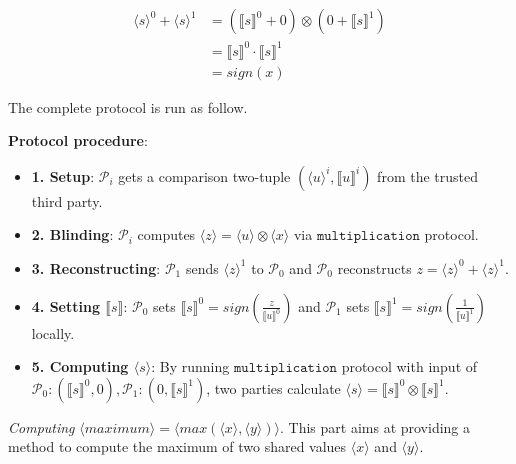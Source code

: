 \documentclass[letterpaper]{article} %
\begin{document}
    \begin{align*}
        \langle s\rangle^{0} +\langle s\rangle^{1}&=(\llbracket s \rrbracket ^{0}+0)\otimes (0+\llbracket s \rrbracket ^{1})\\
        &=\llbracket s \rrbracket ^{0}\cdot \llbracket s \rrbracket ^{1}\\
        &=sign(x)
    \end{align*}

    

    
       The complete protocol is run as follow. 
    
       \textbf{Protocol procedure}:
       \begin{itemize}
           \item \textbf{1. Setup}: $\mathcal{P}_{i}$ gets a comparison two-tuple $(\langle u\rangle ^{i},\llbracket u \rrbracket ^{i})$ from the trusted third party.
           
           \item \textbf{2. Blinding}: 
           $\mathcal{P}_{i}$ computes $\langle z\rangle = \langle u\rangle \otimes \langle x\rangle $ via $\mathtt{multiplication}$ protocol.


           \item \textbf{3. Reconstructing}:
           $\mathcal{P}_{1}$ sends $\langle z\rangle ^{1}$ to $\mathcal{P}_{0}$ and 
           $\mathcal{P}_{0}$ reconstructs
           $z = \langle z\rangle ^{0}+\langle z\rangle ^{1}$.


        
           \item \textbf{4. Setting $\llbracket s \rrbracket$}: 
           $\mathcal{P}_{0}$ sets $\llbracket s \rrbracket^{0}
           =sign(\frac{z}{\llbracket u \rrbracket^{0}})$
           and $\mathcal{P}_{1}$ sets $\llbracket s \rrbracket^{1}
           =sign(\frac{1}{\llbracket u \rrbracket^{1}})$ locally.
       
           \item \textbf{5. Computing $\langle s\rangle$}: 
           By running $\mathtt{multiplication}$ protocol with input of 
           $\mathcal{P}_{0}:(\llbracket s \rrbracket ^{0},0),\mathcal{P}_{1}:(0,\llbracket s \rrbracket ^{1})$, 
           two parties calculate  $\langle s\rangle = \llbracket s \rrbracket ^{0}\otimes \llbracket s \rrbracket ^{1}$.

       \end{itemize}
    

    
       \emph{Computing} $ \langle maximum\rangle  = \langle max(\langle x\rangle,\langle y\rangle)\rangle $.
       This part aims at providing a method to compute the maximum of two shared values $\langle x \rangle$ and $\langle y \rangle$.
       
\end{document}
